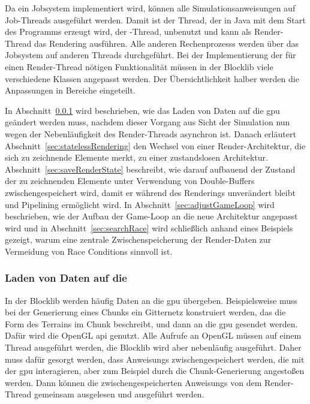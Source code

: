 Da ein Jobsystem implementiert wird, können alle Simulationsanweisungen auf Job-Threads ausgeführt werden. Damit ist der Thread, der in Java mit dem Start des Programms erzeugt wird, der -Thread, unbenutzt und kann als Render-Thread das Rendering ausführen. Alle anderen \glspl{Rechenprozess} werden über das Jobsystem auf anderen Threads durchgeführt. Bei der Implementierung der für einen Render-Thread nötigen Funktionalität müssen in der Blocklib viele verschiedene Klassen angepasst werden. Der Übersichtlichkeit halber werden die Anpassungen in Bereiche eingeteilt. 

In Abschnitt~\ref{sec:loader} wird beschrieben, wie das Laden von Daten auf die \ac{gpu} geändert werden muss, nachdem dieser Vorgang aus Sicht der Simulation nun wegen der Nebenläufigkeit des Render-Threads asynchron ist. Danach erläutert Abschnitt~\ref{sec:statelessRendering} den Wechsel von einer Render-Architektur, die sich zu zeichnende Elemente merkt, zu einer zustandslosen Architektur. Abschnitt~\ref{sec:saveRenderState} beschreibt, wie darauf aufbauend der Zustand der zu zeichnenden Elemente unter Verwendung von Double-Buffers zwischengespeichert wird, damit er während des Renderings unverändert bleibt und Pipelining ermöglicht wird. In Abschnitt~\ref{sec:adjustGameLoop} wird beschrieben, wie der Aufbau der Game-Loop an die neue Architektur angepasst wird und in Abschnitt~\ref{sec:searchRace} wird schließlich anhand eines Beispiels gezeigt, warum eine zentrale Zwischenspeicherung der Render-Daten zur Vermeidung von Race Conditions sinnvoll ist.

\subsubsection{Laden von Daten auf die }\label{sec:loader}
In der Blocklib werden häufig Daten an die \ac{gpu} übergeben. Beispielsweise muss bei der Generierung eines Chunks ein Gitternetz konstruiert werden, das die Form des Terrains im Chunk beschreibt, und dann an die \ac{gpu} gesendet werden. Dafür wird die OpenGL \acs{api} genutzt. Alle Aufrufe an OpenGL müssen auf einem Thread ausgeführt werden, die Blocklib wird aber nebenläufig ausgeführt. Daher muss dafür gesorgt werden, dass \glspl{Anweisung} zwischengespeichert werden, die mit der \ac{gpu} interagieren, aber zum Beispiel durch die Chunk-Generierung angestoßen werden. Dann können die zwischengespeicherten \glspl{Anweisung} von dem Render-Thread gemeinsam ausgelesen und ausgeführt werden. 


